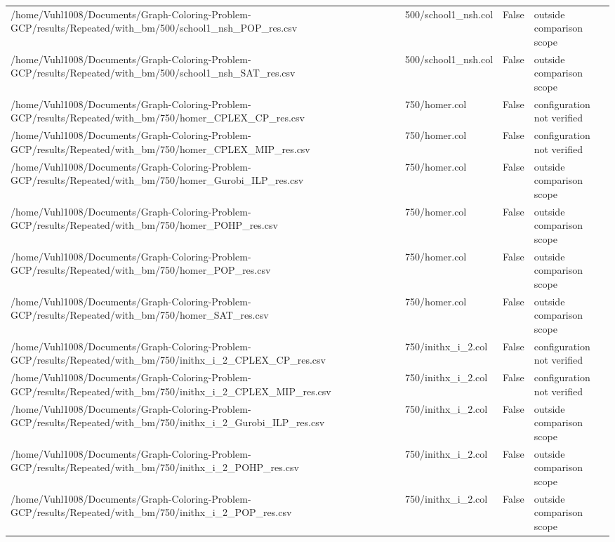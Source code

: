 \begin{table}[htbp]
\begin{tabular}{llll}
/home/Vuhl1008/Documents/Graph-Coloring-Problem-GCP/results/Repeated/with\_bm/500/school1\_nsh\_POP\_res.csv & 500/school1\_nsh.col & False & outside comparison scope \\
/home/Vuhl1008/Documents/Graph-Coloring-Problem-GCP/results/Repeated/with\_bm/500/school1\_nsh\_SAT\_res.csv & 500/school1\_nsh.col & False & outside comparison scope \\
/home/Vuhl1008/Documents/Graph-Coloring-Problem-GCP/results/Repeated/with\_bm/750/homer\_CPLEX\_CP\_res.csv & 750/homer.col & False & configuration not verified \\
/home/Vuhl1008/Documents/Graph-Coloring-Problem-GCP/results/Repeated/with\_bm/750/homer\_CPLEX\_MIP\_res.csv & 750/homer.col & False & configuration not verified \\
/home/Vuhl1008/Documents/Graph-Coloring-Problem-GCP/results/Repeated/with\_bm/750/homer\_Gurobi\_ILP\_res.csv & 750/homer.col & False & outside comparison scope \\
/home/Vuhl1008/Documents/Graph-Coloring-Problem-GCP/results/Repeated/with\_bm/750/homer\_POHP\_res.csv & 750/homer.col & False & outside comparison scope \\
/home/Vuhl1008/Documents/Graph-Coloring-Problem-GCP/results/Repeated/with\_bm/750/homer\_POP\_res.csv & 750/homer.col & False & outside comparison scope \\
/home/Vuhl1008/Documents/Graph-Coloring-Problem-GCP/results/Repeated/with\_bm/750/homer\_SAT\_res.csv & 750/homer.col & False & outside comparison scope \\
/home/Vuhl1008/Documents/Graph-Coloring-Problem-GCP/results/Repeated/with\_bm/750/inithx\_i\_2\_CPLEX\_CP\_res.csv & 750/inithx\_i\_2.col & False & configuration not verified \\
/home/Vuhl1008/Documents/Graph-Coloring-Problem-GCP/results/Repeated/with\_bm/750/inithx\_i\_2\_CPLEX\_MIP\_res.csv & 750/inithx\_i\_2.col & False & configuration not verified \\
/home/Vuhl1008/Documents/Graph-Coloring-Problem-GCP/results/Repeated/with\_bm/750/inithx\_i\_2\_Gurobi\_ILP\_res.csv & 750/inithx\_i\_2.col & False & outside comparison scope \\
/home/Vuhl1008/Documents/Graph-Coloring-Problem-GCP/results/Repeated/with\_bm/750/inithx\_i\_2\_POHP\_res.csv & 750/inithx\_i\_2.col & False & outside comparison scope \\
/home/Vuhl1008/Documents/Graph-Coloring-Problem-GCP/results/Repeated/with\_bm/750/inithx\_i\_2\_POP\_res.csv & 750/inithx\_i\_2.col & False & outside comparison scope \\

\end{tabular}
\end{table}
